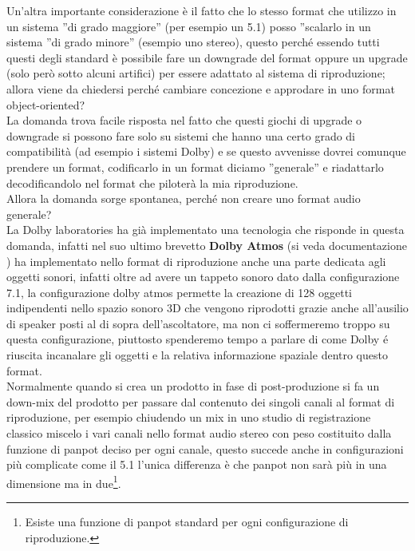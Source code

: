 \documentclass[12pt,a4paper]{report}
\begin{document}
Un'altra importante considerazione è il fatto che lo stesso format che utilizzo in un sistema ''di grado maggiore'' (per esempio un 5.1) posso ''scalarlo in un sistema ''di grado minore'' (esempio uno stereo), questo perché essendo tutti questi degli standard è possibile fare un downgrade del format oppure un upgrade (solo però sotto alcuni artifici) per essere adattato al sistema di riproduzione; allora viene da chiedersi perché cambiare concezione e approdare in uno format object-oriented?\\

La domanda trova facile risposta nel fatto che questi giochi di upgrade o downgrade si possono fare solo su sistemi che hanno una certo grado di compatibilità (ad esempio i sistemi Dolby) e se questo avvenisse dovrei comunque prendere un format, codificarlo in un format diciamo ''generale'' e riadattarlo decodificandolo nel format che piloterà la mia riproduzione.\\

Allora la domanda sorge spontanea, perché non creare uno format audio generale?\\

La Dolby laboratories ha già implementato una tecnologia che risponde in questa domanda, infatti nel suo ultimo brevetto \textbf{Dolby Atmos} (si veda documentazione \cite{atmos}) ha implementato nello format di riproduzione anche una parte dedicata agli oggetti sonori, infatti oltre ad avere un tappeto sonoro dato dalla configurazione 7.1, la configurazione dolby atmos permette la creazione di 128 oggetti indipendenti nello spazio sonoro 3D che vengono riprodotti grazie anche all'ausilio di speaker posti al di sopra dell'ascoltatore, ma non ci soffermeremo troppo su questa configurazione, piuttosto spenderemo tempo a parlare di come Dolby é riuscita incanalare gli oggetti e la relativa informazione spaziale dentro questo format.\\

Normalmente quando si crea un prodotto in fase di post-produzione si fa un down-mix del prodotto per passare dal contenuto dei singoli canali al format di riproduzione, per esempio chiudendo un mix in uno studio di registrazione classico miscelo i vari canali nello format audio stereo con peso costituito dalla funzione di panpot deciso per ogni canale, questo succede anche in configurazioni più complicate come il 5.1 l'unica differenza è che panpot non sarà più in una dimensione ma in due\footnote{Esiste una funzione di panpot standard per ogni configurazione di riproduzione.}.\\
\end{document}
